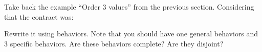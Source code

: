 

Take back the example ``Order 3 values'' from the previous section. Considering
that the contract was:




Rewrite it using behaviors. Note that you should have one general behaviors
and 3 specific behaviors. Are these behaviors complete? Are they disjoint?
